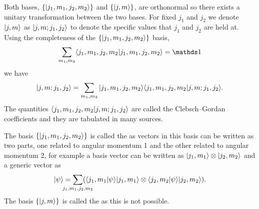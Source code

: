 Both bases, \(\{\vert {j_1, m_1, j_2, m_2} \rangle\}\) and \(\{\vert {j, m} \rangle\}\), are orthonormal so there exists a unitary transformation between the two bases.
For fixed \(j_1\) and \(j_2\) we denote \(\vert {j, m} \rangle\) as \(\vert {j, m; j_1, j_2} \rangle\) to denote the specific values that \(j_1\) and \(j_2\) are held at.
Using the completeness of the \(\{\vert {j_1, m_1, j_2, m_2} \rangle\}\) basis,
\[\sum_{m_1, m_2} \braket{j_1, m_1, j_2, m_2}{j_1, m_1, j_2, m_2} = \ident\]
we have
\[\vert {j, m; j_1, j_2} \rangle = \sum_{m_1, m_2} \vert {j_1, m_1, j_2, m_2} \rangle\langle {j_1, m_1, j_2, m_2} \vert {j, m; j_1, j_2} \rangle.\]
The quantities \(\langle {j_1, m_1, j_2, m_2} \vert {j, m; j_1, j_2} \rangle\) are called the Clebsch--Gordan coefficients and they are tabulated in many sources.

The basis \(\{\vert {j_1, m_1, j_2, m_2} \rangle\}\) is called the  as vectors in this basis can be written as two parts, one related to angular momentum 1 and the other related to angular momentum 2, for example a basis vector can be written as \(\vert {j_1, m_1} \rangle\otimes\vert {j_2, m_2} \rangle\) and a generic vector as
\[\ket{\psi} = \sum_{\mathclap{j_1, m_1, j_2, m_2}}(\braket{j_1, m_1}{\psi}\ket{j_1, m_1} \tensorProd\braket{j_2, m_2}{\psi}\ket{j_2, m_2}).\]
The basis \(\{\vert {j, m} \rangle\}\) is called the  as this is not possible.

